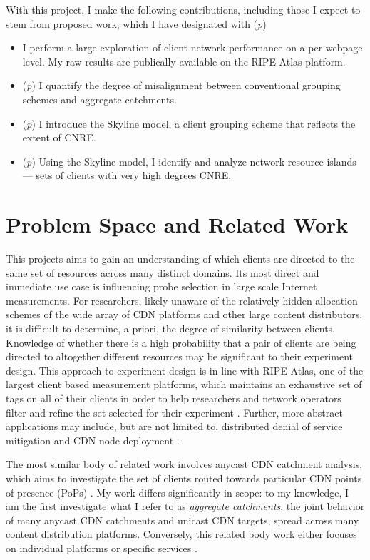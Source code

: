 With this project, I make the following contributions, including those I expect to stem from
proposed work, which I have designated with (\emph{p})

\begin{itemize}\parskip0pt 
    \item I perform a large exploration of client network performance on a per webpage level. My
        raw results are publically available on the RIPE Atlas platform.
    \item (\emph{p}) I quantify the degree of misalignment between conventional grouping schemes
        and aggregate catchments.
    \item (\emph{p}) I introduce the Skyline model, a client grouping scheme that reflects the
        extent of CNRE.
    \item (\emph{p}) Using the Skyline model, I identify and analyze network resource islands --- 
        sets of clients with very high degrees CNRE. 
\end{itemize}

\section{Problem Space and Related Work} \label{skyspace}

This projects aims to gain an understanding of which clients are directed to the same set of
resources across many distinct domains. Its most direct and immediate use case is influencing probe
selection in large scale Internet measurements. For researchers, likely unaware of the relatively
hidden allocation schemes of the wide array of CDN platforms and other large content distributors,
it is difficult to determine, a priori, the degree of similarity between clients. Knowledge of
whether there is a high probability that a pair of clients are being directed to altogether
different resources may be significant to their experiment design. This approach to experiment
design is in line with RIPE Atlas, one of the largest client based measurement platforms,
which maintains
an exhaustive set of tags on all of their clients in order to help researchers and network operators
filter and refine the set selected for their experiment \cite{ripe-atlas}. Further, more abstract
applications may include, but are not limited to, distributed denial of service mitigation
\cite{anycastvsddos} and CDN node deployment \cite{35590, Tariq}.

The most similar body of related work involves anycast CDN catchment analysis, which aims to
investigate the set of clients routed towards particular CDN points of presence (PoPs)
\cite{Calder2015, anycastvsddos, vdmscatchment}. My work differs significantly in scope: to my
knowledge, I am the first investigate what I refer to as \emph{aggregate catchments}, the joint
behavior of many anycast CDN catchments and unicast CDN targets, spread across many content
distribution platforms. Conversely, this related body work either focuses on individual platforms or
specific services \cite{Calder2015, anycastvsddos, vdmscatchment}. 

